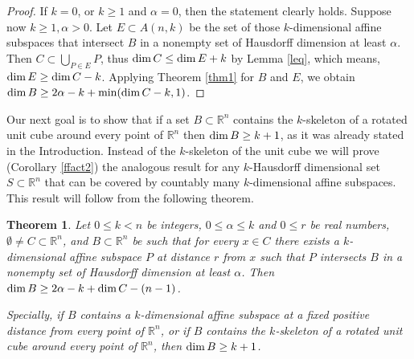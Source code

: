 \documentclass[a4paper]{amsart}
\newtheorem{theorem}{Theorem}[section]
\theoremstyle{definition} \newtheorem{remark}[theorem]{Remark}
\def\rr{{\mathbb R}}
\def\R{{\mathbb R}}
\def\su{\subset}
\def\al{\alpha}
\def\dim{{\rm dim}\, }
\begin{document}
\begin{proof}
If $k=0$, or $k \geq 1$ and $\al=0$, then the statement clearly holds. Suppose now $k \geq 1, \al>0$. 
Let $E \su A(n,k)$ be the set of those $k$-dimensional affine subspaces that intersect
$B$ in a nonempty set of Hausdorff dimension at least $\al$. 
%
Then $C \su \bigcup_{P \in E} P$, thus 
$\dim C \leq \dim E + k$ by Lemma \ref{leq}, which means, $\dim E \geq \dim C-k$. 
Applying Theorem \ref{thm1} for $B$ and $E$, we obtain 
$\dim B \geq 2\al-k + \min(\dim C - k, 1)$.
\end{proof}

Our next goal is to show that if a set $B\su\R^n$ contains the
$k$-skeleton of a rotated unit cube around every point of $\R^n$ then
$\dim B\ge k+1$, as it was already stated in the Introduction.
Instead of the $k$-skeleton of the unit cube we will prove (Corollary \ref{ffact2}) the analogous result
for any $k$-Hausdorff dimensional set $S\su\R^n$ that can be covered by 
countably many $k$-dimensional affine subspaces. 
This result will follow from the following theorem.

\begin{theorem}
\label{fact2}
Let $0 \leq k < n$ be integers, $0 \leq \al \leq k$ and $0 \leq r$ be real numbers, $\emptyset \neq C \su \rr^n$, and $B \su \rr^n$ be
such that for every $x \in C$ there exists a $k$-dimensional affine subspace $P$
at distance $r$ from $x$ such that $P$ intersects $B$ in a nonempty set of Hausdorff dimension at least $\al$. 
Then $\dim B \geq 2\al-k + \dim C - (n-1)$.

Specially, if $B$ contains a $k$-dimensional affine subspace at a fixed positive distance from every point of $\R^n$, or 
if $B$ contains the $k$-skeleton of a rotated unit cube around every point of $\rr^n$, then $\dim B\ge k+1$.
\end{theorem}
\end{document}

